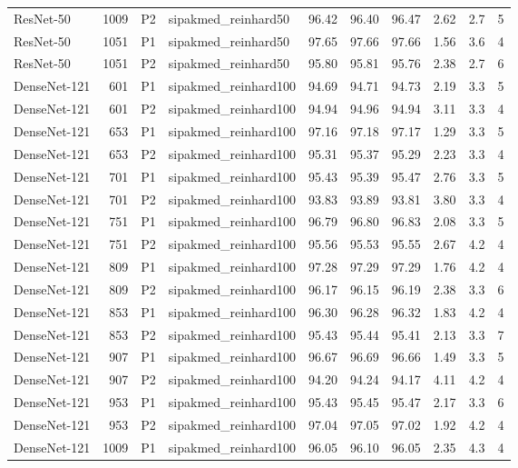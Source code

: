 {\begin{longtable}{lrllrrrrrr}
ResNet-50 & 1009 & P2 & sipakmed\_reinhard50 & 96.42 & 96.40 & 96.47 & 2.62 & 2.7 & 5 \\
ResNet-50 & 1051 & P1 & sipakmed\_reinhard50 & 97.65 & 97.66 & 97.66 & 1.56 & 3.6 & 4 \\
ResNet-50 & 1051 & P2 & sipakmed\_reinhard50 & 95.80 & 95.81 & 95.76 & 2.38 & 2.7 & 6 \\
DenseNet-121 & 601 & P1 & sipakmed\_reinhard100 & 94.69 & 94.71 & 94.73 & 2.19 & 3.3 & 5 \\
DenseNet-121 & 601 & P2 & sipakmed\_reinhard100 & 94.94 & 94.96 & 94.94 & 3.11 & 3.3 & 4 \\
DenseNet-121 & 653 & P1 & sipakmed\_reinhard100 & 97.16 & 97.18 & 97.17 & 1.29 & 3.3 & 5 \\
DenseNet-121 & 653 & P2 & sipakmed\_reinhard100 & 95.31 & 95.37 & 95.29 & 2.23 & 3.3 & 4 \\
DenseNet-121 & 701 & P1 & sipakmed\_reinhard100 & 95.43 & 95.39 & 95.47 & 2.76 & 3.3 & 5 \\
DenseNet-121 & 701 & P2 & sipakmed\_reinhard100 & 93.83 & 93.89 & 93.81 & 3.80 & 3.3 & 4 \\
DenseNet-121 & 751 & P1 & sipakmed\_reinhard100 & 96.79 & 96.80 & 96.83 & 2.08 & 3.3 & 5 \\
DenseNet-121 & 751 & P2 & sipakmed\_reinhard100 & 95.56 & 95.53 & 95.55 & 2.67 & 4.2 & 4 \\
DenseNet-121 & 809 & P1 & sipakmed\_reinhard100 & 97.28 & 97.29 & 97.29 & 1.76 & 4.2 & 4 \\
DenseNet-121 & 809 & P2 & sipakmed\_reinhard100 & 96.17 & 96.15 & 96.19 & 2.38 & 3.3 & 6 \\
DenseNet-121 & 853 & P1 & sipakmed\_reinhard100 & 96.30 & 96.28 & 96.32 & 1.83 & 4.2 & 4 \\
DenseNet-121 & 853 & P2 & sipakmed\_reinhard100 & 95.43 & 95.44 & 95.41 & 2.13 & 3.3 & 7 \\
DenseNet-121 & 907 & P1 & sipakmed\_reinhard100 & 96.67 & 96.69 & 96.66 & 1.49 & 3.3 & 5 \\
DenseNet-121 & 907 & P2 & sipakmed\_reinhard100 & 94.20 & 94.24 & 94.17 & 4.11 & 4.2 & 4 \\
DenseNet-121 & 953 & P1 & sipakmed\_reinhard100 & 95.43 & 95.45 & 95.47 & 2.17 & 3.3 & 6 \\
DenseNet-121 & 953 & P2 & sipakmed\_reinhard100 & 97.04 & 97.05 & 97.02 & 1.92 & 4.2 & 4 \\
DenseNet-121 & 1009 & P1 & sipakmed\_reinhard100 & 96.05 & 96.10 & 96.05 & 2.35 & 4.3 & 4 \\

\end{longtable}}
